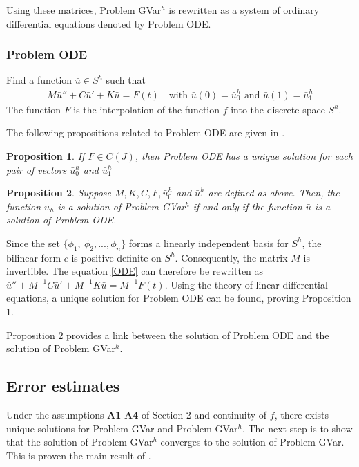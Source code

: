 \documentclass[../../main.tex]{subfiles}
\begin{document}
Using these matrices, Problem GVar$^h$ is rewritten as a system of ordinary
differential equations denoted by Problem ODE. \subsubsection*{Problem ODE}
Find a function $\bar{u} \in S^h$ such that \label{sym:baru}
\begin{eqnarray}
	M\bar{u}'' + C \bar{u}' + K\bar{u} = F(t) \ \ \ \textrm{ with } \bar{u}(0) = \bar{u}^h_0 \textrm{ and }  \bar{u}(1) = \bar{u}^h_1 \label{ODE}
\end{eqnarray}
The function $F$ is the interpolation of the function $f$ into the discrete space $S^h$.

The following propositions related to Problem ODE are given in \cite{BV13}.

\newtheorem{DC_Prop2}{Proposition}
\begin{DC_Prop2}
	If $F\in C(J)$, then Problem ODE has a unique solution for each pair of vectors $\bar{u}^h_0$ and $\bar{u}^h_1$
\end{DC_Prop2}

\newtheorem{DC_Prop3}[DC_Prop2]{Proposition}
\begin{DC_Prop3}
	Suppose $M, K, C, F,\bar{u}^h_0$ and $\bar{u}^h_1$ are defined as above. Then, the function $u_{h}$ is a solution of Problem GVar$^{h}$ if and only if the function $\bar{u}$ is a solution of Problem ODE.
\end{DC_Prop3}

Since the set $\{\phi_1, \ \phi_2,...,\phi_n\}$ forms a linearly independent
basis for $S^h$, the bilinear form $c$ is positive definite on $S^h$.
Consequently, the matrix $M$ is invertible. The equation \eqref{ODE} can
therefore be rewritten as $\bar{u}'' + M^{-1}C\bar{u}' + M^{-1}K \bar{u} =
	M^{-1}F(t)$. Using the theory of linear differential equations, a unique
solution for Problem ODE can be found, proving Proposition 1.

Proposition 2 provides a link between the solution of Problem ODE and the
solution of Problem GVar$^h$.

\subsection{Error estimates}\label{e_est}
Under the assumptions \textbf{A1}-\textbf{A4} of Section 2 and continuity of $f$, there exists unique solutions for Problem GVar and Problem GVar$^h$. The next step is to show that the solution of Problem GVar$^h$ converges to the solution of Problem GVar. This is proven the main result of \cite{BV13}.
\end{document}
